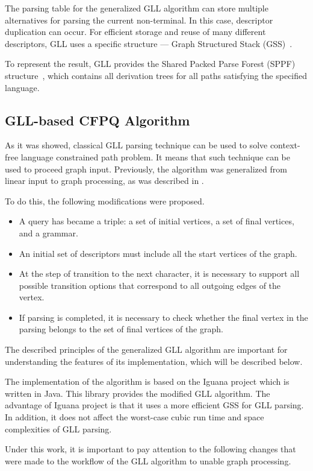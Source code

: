 The parsing table for the generalized GLL algorithm can store multiple alternatives for parsing the current non-terminal. In this case, descriptor duplication can occur. For efficient storage and reuse of many different descriptors, GLL uses a specific structure --- Graph Structured Stack (GSS)~\cite{10.5555/1623611.1623625}.

To represent the result, GLL provides the Shared Packed Parse Forest (SPPF) structure~\cite{SCOTT20131828}, which contains all derivation trees for all paths satisfying the specified language.

\subsection{GLL-based CFPQ Algorithm}
As it was showed, classical GLL parsing technique can be used to solve context-free language constrained path problem. It means that such technique can be used to proceed graph input. Previously, the algorithm was generalized from linear input to graph processing, as was described in \cite{10.1145/3166094.3166104}.

To do this, the following modifications were proposed.
\begin{itemize}
\item A query has became a triple: a set of initial vertices, a set of final vertices, and a grammar.
\item An initial set of descriptors must include all the start vertices of the graph.
\item At the step of transition to the next character, it is necessary to support all possible transition options that correspond to all outgoing edges of the vertex.
\item If parsing is completed, it is necessary to check whether the final vertex in the parsing belongs to the set of final vertices of the graph.
\end{itemize}

The described principles of the generalized GLL algorithm are important for understanding the features of its implementation, which will be described below.

The implementation of the algorithm is based on the Iguana project which is written in Java. This library provides the modified GLL algorithm. The advantage of  Iguana project is that it uses a more efficient GSS for GLL parsing. In addition, it does not affect the worst-case cubic run time and space complexities of GLL parsing.
 
Under this work, it is important to pay attention to the following changes that were made to the workflow of the GLL algorithm to unable graph processing.

